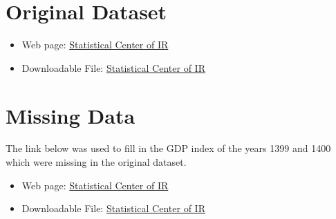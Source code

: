 \documentclass[fleqn]{report}
\begin{document}
\section*{Original Dataset}
\begin{itemize}
    \item Web page: \href{https://www.amar.org.ir/%D8%AF%D8%A7%D8%AF%D9%87%D9%87%D8%A7-%D9%88-%D8%A7%D8%B7%D9%84%D8%A7%D8%B9%D8%A7%D8%AA-%D8%A2%D9%85%D8%A7%D8%B1%DB%8C/%D8%AD%D8%B3%D8%A7%D8%A8-%D9%87%D8%A7%DB%8C-%D9%85%D9%84%DB%8C-%D9%88-%D9%85%D9%86%D8%B7%D9%82%D9%87%D8%A7%DB%8C/%D8%AD%D8%B3%D8%A7%D8%A8%D9%87%D8%A7%DB%8C-%D9%85%D9%84%DB%8C#5603751--}{Statistical Center of IR}
    \item Downloadable File: \href{https://www.amar.org.ir/Portals/0/PropertyAgent/461/Files/6672/Annual_Accounts_1340-1398_base1390_BL.xlsx}{Statistical Center of IR}
\end{itemize}
\section*{Missing Data}
The link below was used to fill in the GDP index of the years 1399 and 1400 which were missing in the original dataset. 
\begin{itemize}
    \item Web page: \href{https://www.amar.org.ir/news/ID/18436/%D9%86%D8%B1%D8%AE-%D8%B1%D8%B4%D8%AF-%D8%A7%D9%82%D8%AA%D8%B5%D8%A7%D8%AF%DB%8C-1400}{Statistical Center of IR}
    \item Downloadable File: \href{https://www.amar.org.ir/Portals/0/News/1400/roshde%201400.pdf?ver=K4G5UWe8_VsFbip8dPoiOA%3D%3D}{Statistical Center of IR}
\end{itemize}
\end{document}
